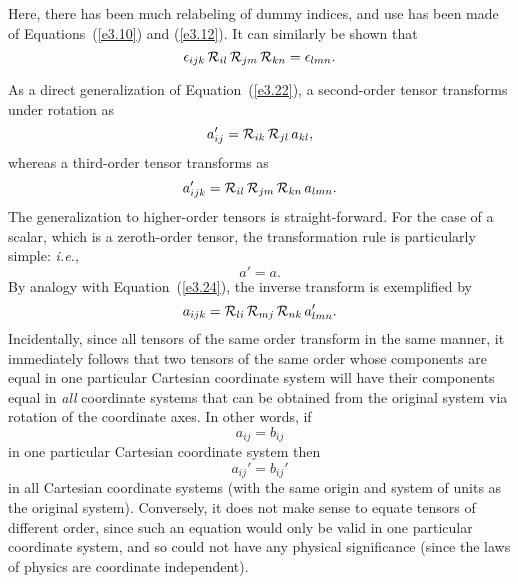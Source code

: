 Here, there has been much relabeling of dummy indices, and use has been made of Equations~(\ref{e3.10}) and (\ref{e3.12}). It can similarly be shown that
\begin{equation}
\epsilon_{ijk}\,{\cal R}_{il}\,{\cal R}_{jm}\,{\cal R}_{kn} = \epsilon_{lmn}.
\end{equation}

As a direct generalization of Equation~(\ref{e3.22}), a second-order tensor transforms under
rotation as
\begin{equation}
a_{ij}' = {\cal R}_{ik}\,{\cal R}_{jl}\,a_{kl},
\end{equation}
whereas a third-order tensor transforms as
\begin{equation}
a_{ijk}' = {\cal R}_{il}\,{\cal R}_{jm}\,{\cal R}_{kn}\,a_{lmn}.
\end{equation}
The generalization to higher-order tensors is straight-forward. For the  case of a scalar, which is a zeroth-order
tensor, the transformation rule is particularly simple: {\em i.e.}, 
\begin{equation}
a' = a.
\end{equation}
By analogy with Equation~(\ref{e3.24}), the inverse transform is
exemplified by 
\begin{equation}
a_{ijk} = {\cal R}_{li}\,{\cal R}_{mj}\,{\cal R}_{nk}\,a_{lmn}'.
\end{equation}
Incidentally, since all tensors of the same order transform in the same manner, it immediately
follows that two tensors of the same order whose components are equal in one particular Cartesian coordinate system
will have their components equal in {\em all}\/ coordinate systems that can be obtained from the original
system via rotation of the coordinate axes. In other words,
if
\begin{equation}
a_{ij} = b_{ij}
\end{equation}
in one particular Cartesian coordinate system then
\begin{equation}
a_{ij}'=b_{ij}'
\end{equation}
in all Cartesian coordinate systems (with the same origin and system of units as the original system).
Conversely, it does not make sense to equate tensors of different order, since such an equation would
only be valid in one particular coordinate system, and so could not have any physical significance (since the
laws of physics are coordinate independent). 

